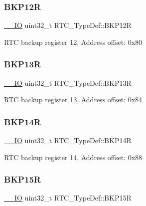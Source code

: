 \subsubsection{\texorpdfstring{B\+K\+P12R}{BKP12R}}
{\footnotesize\ttfamily \hyperlink{core__sc300_8h_aec43007d9998a0a0e01faede4133d6be}{\+\_\+\+\_\+\+IO} uint32\+\_\+t R\+T\+C\+\_\+\+Type\+Def\+::\+B\+K\+P12R}

R\+TC backup register 12, Address offset\+: 0x80 \mbox{\label{struct_r_t_c___type_def_a138903d4681455a660dccbaf3409263d}} 
\subsubsection{\texorpdfstring{B\+K\+P13R}{BKP13R}}
{\footnotesize\ttfamily \hyperlink{core__sc300_8h_aec43007d9998a0a0e01faede4133d6be}{\+\_\+\+\_\+\+IO} uint32\+\_\+t R\+T\+C\+\_\+\+Type\+Def\+::\+B\+K\+P13R}

R\+TC backup register 13, Address offset\+: 0x84 \mbox{\label{struct_r_t_c___type_def_adaae50f5c3213014fb9818eaee389676}} 
\subsubsection{\texorpdfstring{B\+K\+P14R}{BKP14R}}
{\footnotesize\ttfamily \hyperlink{core__sc300_8h_aec43007d9998a0a0e01faede4133d6be}{\+\_\+\+\_\+\+IO} uint32\+\_\+t R\+T\+C\+\_\+\+Type\+Def\+::\+B\+K\+P14R}

R\+TC backup register 14, Address offset\+: 0x88 \mbox{\label{struct_r_t_c___type_def_a797f43f9cc1858baebd1799be288dff6}} 
\subsubsection{\texorpdfstring{B\+K\+P15R}{BKP15R}}
{\footnotesize\ttfamily \hyperlink{core__sc300_8h_aec43007d9998a0a0e01faede4133d6be}{\+\_\+\+\_\+\+IO} uint32\+\_\+t R\+T\+C\+\_\+\+Type\+Def\+::\+B\+K\+P15R}

